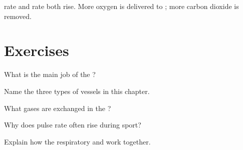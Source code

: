 \begin{example}\label{ex:g5:circulation:stairs}
 rate and  rate both rise. More oxygen is delivered to
 ; more carbon dioxide is removed.
\end{example}

\section{Exercises}

\begin{exercise}[$\star$]\label{exo:g5:circulation:1}
What is the main job of the ?
\end{exercise}

\begin{exercise}[$\star$]\label{exo:g5:circulation:2}
Name the three types of  vessels in this chapter.
\end{exercise}

\begin{exercise}[$\star$]\label{exo:g5:circulation:3}
What gases are exchanged in the ?
\end{exercise}

\begin{exercise}[$\star$]\label{exo:g5:circulation:4}
Why does pulse rate often rise during sport?
\end{exercise}

\begin{exercise}[$\star\star$]\label{exo:g5:circulation:5}
Explain how the respiratory and  work together.
\end{exercise}

